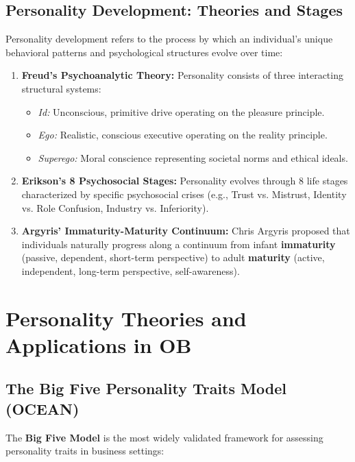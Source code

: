 \documentclass[12pt,a4paper]{article}
\begin{document}
\subsection{Personality Development: Theories and Stages}
Personality development refers to the process by which an individual's unique behavioral patterns and psychological structures evolve over time:

\begin{enumerate}[leftmargin=*, itemsep=4pt]
  \item \textbf{Freud's Psychoanalytic Theory:} Personality consists of three interacting structural systems:
    \begin{itemize}[leftmargin=*, noitemsep]
      \item \textit{Id:} Unconscious, primitive drive operating on the pleasure principle.
      \item \textit{Ego:} Realistic, conscious executive operating on the reality principle.
      \item \textit{Superego:} Moral conscience representing societal norms and ethical ideals.
    \end{itemize}
  \item \textbf{Erikson's 8 Psychosocial Stages:} Personality evolves through 8 life stages characterized by specific psychosocial crises (e.g., Trust vs. Mistrust, Identity vs. Role Confusion, Industry vs. Inferiority).
  \item \textbf{Argyris' Immaturity-Maturity Continuum:} Chris Argyris proposed that individuals naturally progress along a continuum from infant \textbf{immaturity} (passive, dependent, short-term perspective) to adult \textbf{maturity} (active, independent, long-term perspective, self-awareness).
\end{enumerate}

\section{Personality Theories and Applications in OB}

\subsection{The Big Five Personality Traits Model (OCEAN)}
The \textbf{Big Five Model} is the most widely validated framework for assessing personality traits in business settings:
\end{document}
